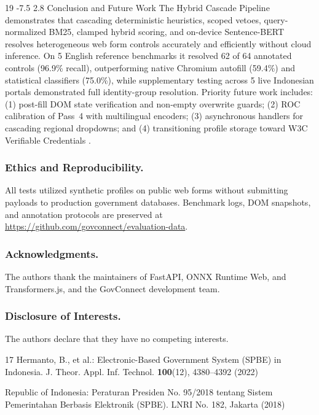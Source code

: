 \documentclass[runningheads,a4paper]{llncs}
\makeatletter
\renewcommand\section{\@startsection{section}{1}{\z@}%
  {-7.5\p@ \@plus -2\p@ \@minus -1\p@}%
  {2.8\p@ \@plus 1\p@}%
  {\normalfont\large\bfseries}}
\makeatother
\begin{document}
\begin{thebibliography}{19}
\section{Conclusion and Future Work}
\noindent The Hybrid Cascade Pipeline demonstrates that cascading deterministic heuristics, scoped vetoes, query-normalized BM25, clamped hybrid scoring, and on-device Sentence-BERT resolves heterogeneous web form controls accurately and efficiently without cloud inference. On 5 English reference benchmarks it resolved 62 of 64 annotated controls (96.9\% recall), outperforming native Chromium autofill (59.4\%) and statistical classifiers (75.0\%), while supplementary testing across 5 live Indonesian portals demonstrated full identity-group resolution. Priority future work includes: (1) post-fill DOM state verification and non-empty overwrite guards; (2) ROC calibration of Pass~4 with multilingual encoders; (3) asynchronous handlers for cascading regional dropdowns; and (4) transitioning profile storage toward W3C Verifiable Credentials \cite{w3cvc2025}.

\subsubsection*{Ethics and Reproducibility.}
All tests utilized synthetic profiles on public web forms without submitting payloads to production government databases. Benchmark logs, DOM snapshots, and annotation protocols are preserved at \url{https://github.com/govconnect/evaluation-data}.

\subsubsection*{Acknowledgments.}
The authors thank the maintainers of FastAPI, ONNX Runtime Web, and Transformers.js, and the GovConnect development team.

\subsubsection*{Disclosure of Interests.}
The authors declare that they have no competing interests.

\begin{thebibliography}{17}
\footnotesize\normalfont
\setlength{\itemsep}{0pt}
Hermanto, B., et al.: Electronic-Based Government System (SPBE) in Indonesia. J. Theor. Appl. Inf. Technol. \textbf{100}(12), 4380--4392 (2022)

Republic of Indonesia: Peraturan Presiden No. 95/2018 tentang Sistem Pemerintahan Berbasis Elektronik (SPBE). LNRI No. 182, Jakarta (2018)


\end{thebibliography}
\end{thebibliography}
\end{document}
